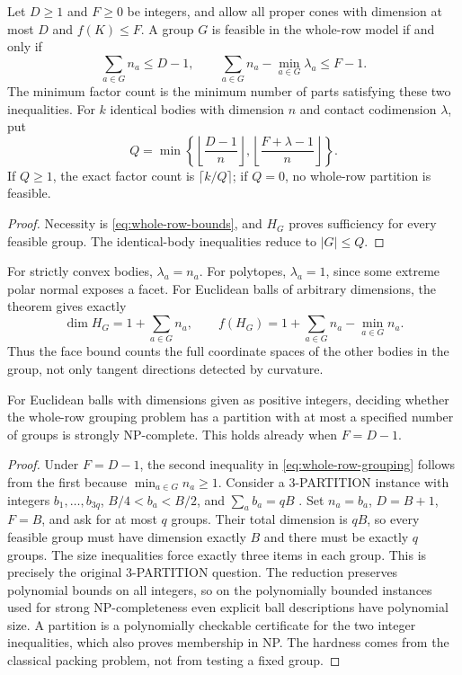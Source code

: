 \begin{corollary}
\label{cor:whole-row-grouping}
Let $D\geq1$ and $F\geq0$ be integers, and allow all proper cones with
dimension at most $D$ and $f(K)\leq F$.
A group $G$ is feasible in the whole-row model if and only if
\begin{equation}\label{eq:whole-row-grouping}
 \sum_{a\in G}n_a\leq D-1,\qquad
 \sum_{a\in G}n_a-\min_{a\in G}\lambda_a\leq F-1.
\end{equation}
The minimum factor count is the minimum number of parts satisfying these
two inequalities. For $k$ identical bodies with dimension $n$ and contact
codimension $\lambda$, put
\[
 Q=\min\left\{\left\lfloor\frac{D-1}{n}\right\rfloor,
                 \left\lfloor\frac{F+\lambda-1}{n}\right\rfloor\right\}.
\]
If $Q\geq1$, the exact factor count is $\lceil k/Q\rceil$; if $Q=0$,
no whole-row partition is feasible.
\end{corollary}
\begin{proof}
Necessity is \eqref{eq:whole-row-bounds}, and $H_G$ proves sufficiency
for every feasible group. The identical-body inequalities reduce to
$|G|\leq Q$.
\end{proof}

For strictly convex bodies, $\lambda_a=n_a$. For polytopes,
$\lambda_a=1$, since some extreme polar normal exposes a facet. For
Euclidean balls of arbitrary dimensions, the theorem gives exactly
\[
 \dim H_G=1+\sum_{a\in G}n_a,\qquad
 f(H_G)=1+\sum_{a\in G}n_a-\min_{a\in G}n_a.
\]
Thus the face bound counts the full coordinate spaces of the other
bodies in the group, not only tangent directions detected by curvature.

\begin{proposition}
\label{prop:whole-row-grouping-hard}
For Euclidean balls with dimensions given as positive integers, deciding
whether the whole-row grouping problem has a partition with at most a
specified number of groups is strongly NP-complete. This holds already
when $F=D-1$.
\end{proposition}
\begin{proof}
Under $F=D-1$, the second inequality in
\eqref{eq:whole-row-grouping} follows from the first because
$\min_{a\in G}n_a\geq1$. Consider a 3-PARTITION instance with integers
$b_1,\ldots,b_{3q}$, $B/4<b_a<B/2$, and $\sum_a b_a=qB$
\cite[Problem SP15]{GareyJohnson1979}. Set $n_a=b_a$, $D=B+1$,
$F=B$, and ask for at most $q$ groups. Their total dimension is $qB$,
so every feasible group must have dimension exactly $B$ and there must
be exactly $q$ groups. The size inequalities force exactly three items
in each group. This is precisely the original 3-PARTITION question.
The reduction preserves polynomial bounds on all integers, so on the
polynomially bounded instances used for strong NP-completeness even
explicit ball descriptions have polynomial size. A partition is a
polynomially checkable certificate for the two integer inequalities,
which also proves membership in NP. The hardness comes from the
classical packing problem, not from testing a fixed group.
\end{proof}


